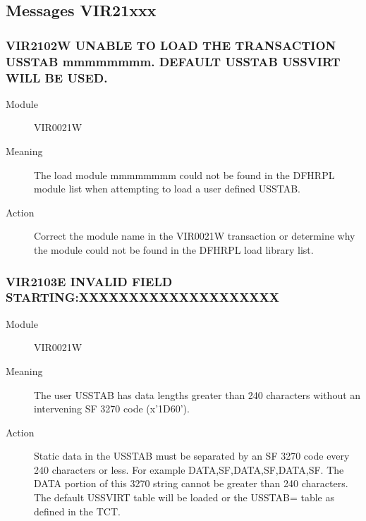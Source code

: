 \documentclass[letterpaper,10pt,english]{sphinxmanual}
\begin{document}
\subsection{Messages VIR21xxx}
\label{\detokenize{messages:messages-vir21xxx}}

\subsubsection{VIR2102W UNABLE TO LOAD THE TRANSACTION USSTAB mmmmmmmm. DEFAULT USSTAB USSVIRT WILL BE USED.}
\label{\detokenize{messages:vir2102w-unable-to-load-the-transaction-usstab-mmmmmmmm-default-usstab-ussvirt-will-be-used}}\begin{description}
\item[{Module}] \leavevmode
VIR0021W

\item[{Meaning}] \leavevmode
The load module mmmmmmmm could not be found in the DFHRPL module list when attempting to load a user defined USSTAB.

\item[{Action}] \leavevmode
Correct the module name in the VIR0021W transaction or determine why the module could not be found in the DFHRPL load library list.

\end{description}


\subsubsection{VIR2103E INVALID FIELD STARTING:XXXXXXXXXXXXXXXXXXXX}
\label{\detokenize{messages:vir2103e-invalid-field-starting-xxxxxxxxxxxxxxxxxxxx}}\begin{description}
\item[{Module}] \leavevmode
VIR0021W

\item[{Meaning}] \leavevmode
The user USSTAB has data lengths greater than 240 characters without an intervening SF 3270 code (x’1D60’).

\item[{Action}] \leavevmode
Static data in the USSTAB must be separated by an SF 3270 code every 240 characters or less. For example DATA,SF,DATA,SF,DATA,SF. The DATA portion of this 3270 string cannot be greater than 240 characters. The default USSVIRT table will be loaded or the USSTAB= table as defined in the TCT.

\end{description}
\end{document}
